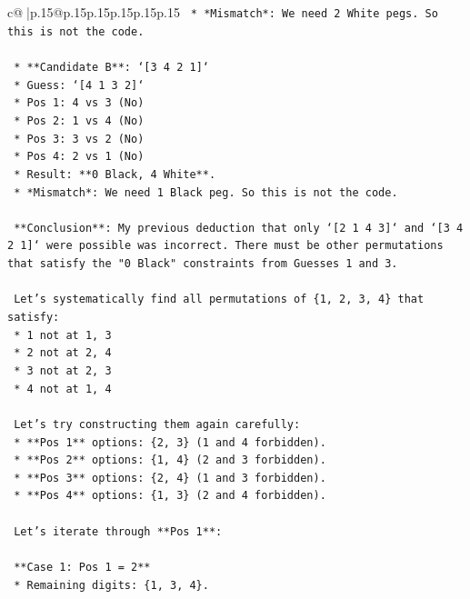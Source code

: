 \documentclass{article}
\begin{document}
{\begin{supertabular}{c@{$\;$}|p{.15\linewidth}@{}p{.15\linewidth}p{.15\linewidth}p{.15\linewidth}p{.15\linewidth}p{.15\linewidth}}
{{{\texttt{        *   *Mismatch*: We need 2 White pegs. So this is not the code.} \\
\\ 
\texttt{    *   **Candidate B**: `{[}3 4 2 1{]}`} \\
\texttt{        *   Guess: `{[}4 1 3 2{]}`} \\
\texttt{        *   Pos 1: 4 vs 3 (No)} \\
\texttt{        *   Pos 2: 1 vs 4 (No)} \\
\texttt{        *   Pos 3: 3 vs 2 (No)} \\
\texttt{        *   Pos 4: 2 vs 1 (No)} \\
\texttt{        *   Result: **0 Black, 4 White**.} \\
\texttt{        *   *Mismatch*: We need 1 Black peg. So this is not the code.} \\
\\ 
\texttt{    **Conclusion**: My previous deduction that only `{[}2 1 4 3{]}` and `{[}3 4 2 1{]}` were possible was incorrect. There must be other permutations that satisfy the "0 Black" constraints from Guesses 1 and 3.} \\
\\ 
\texttt{    Let's systematically find all permutations of \{1, 2, 3, 4\} that satisfy:} \\
\texttt{    *   1 not at 1, 3} \\
\texttt{    *   2 not at 2, 4} \\
\texttt{    *   3 not at 2, 3} \\
\texttt{    *   4 not at 1, 4} \\
\\ 
\texttt{    Let's try constructing them again carefully:} \\
\texttt{    *   **Pos 1** options: \{2, 3\} (1 and 4 forbidden).} \\
\texttt{    *   **Pos 2** options: \{1, 4\} (2 and 3 forbidden).} \\
\texttt{    *   **Pos 3** options: \{2, 4\} (1 and 3 forbidden).} \\
\texttt{    *   **Pos 4** options: \{1, 3\} (2 and 4 forbidden).} \\
\\ 
\texttt{    Let's iterate through **Pos 1**:} \\
\\ 
\texttt{    **Case 1: Pos 1 = 2**} \\
\texttt{    *   Remaining digits: \{1, 3, 4\}.} \\
}}}
\end{supertabular}}
\end{document}
